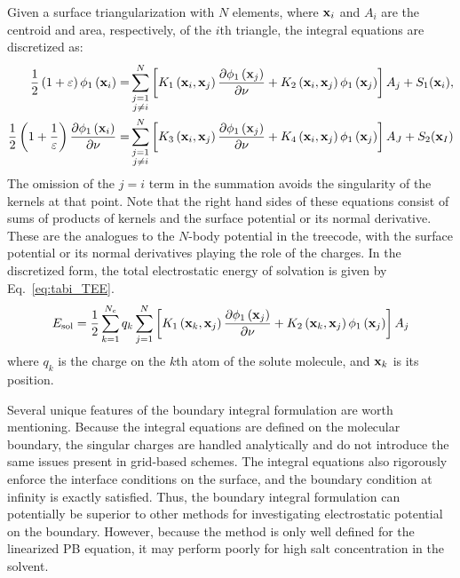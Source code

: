 \documentclass[12pt,titlepage]{article}
\begin{document}
Given a surface triangularization with $N$ elements, where ${\bf x}_i$ and $A_i$ are the centroid and area, respectively, of the $i$th triangle, the integral equations are discretized as:
%
\begin{equation}
\begin{split}
\frac{1}{2}\left(1+\varepsilon\right)\phi_1\left({\bf x}_i\right) =& \sum_{\substack{j=1 \\ j\neq i}}^N \left[K_1\left({\bf x}_i, {\bf x}_j\right) \frac{\partial \phi_1\left({\bf x}_j\right)}{\partial \nu} + K_2\left({\bf x}_i, {\bf x}_j\right) \phi_1\left({\bf x}_j\right) \right]A_j + S_1({\bf x}_i), \\ %
\frac{1}{2}\left(1+\frac{1}{\varepsilon}\right) \frac{\partial \phi_1\left({\bf x}_i\right)}{\partial \nu} =& \sum_{\substack{j=1 \\ j\neq i}}^N \left[K_3\left({\bf x}_i, {\bf x}_j\right) \frac{\partial \phi_1\left({\bf x}_j\right)}{\partial \nu} + K_4\left({\bf x}_i, {\bf x}_j\right) \phi_1\left({\bf x}_j\right) \right]A_J + S_2({\bf x}_I)
\end{split}
\end{equation}
%
The omission of the $j=i$ term in the summation avoids the singularity of the kernels at that point. Note that the right hand sides of these equations consist of sums of products of kernels and the surface potential or its normal derivative. These are the analogues to the $N$-body potential in the treecode, with the surface potential or its normal derivatives playing the role of the charges. In the discretized form, the total electrostatic energy of solvation is given by Eq.~\ref{eq:tabi_TEE}.
%
\begin{equation}
E_\text{sol}=\frac{1}{2}\sum_{k=1}^{N_c}q_k\sum_{j=1}^N \left[K_1\left({\bf x}_k, {\bf x}_j\right) \frac{\partial \phi_1\left({\bf x}_j\right)}{\partial \nu} + K_2\left({\bf x}_k, {\bf x}_j\right) \phi_1\left({\bf x}_j\right) \right]A_j
\label{eq:tabi_TEE}
\end{equation}
%
where $q_k$ is the charge on the $k$th atom of the solute molecule, and ${\bf x}_k$ is its position.

Several unique features of the boundary integral formulation are worth mentioning. Because the integral equations are defined on the molecular boundary, the singular charges are handled analytically and do not introduce the same issues present in grid-based schemes. The integral equations also rigorously enforce the interface conditions on the surface, and the boundary condition at infinity is exactly satisfied. Thus, the boundary integral formulation can potentially be superior to other methods for investigating electrostatic potential on the boundary. However, because the method is only well defined for the linearized PB equation, it may perform poorly for high salt concentration in the solvent.
\end{document}
